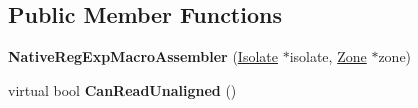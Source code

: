 \subsection*{Public Member Functions}
\begin{DoxyCompactItemize}
\item 
{\bfseries Native\+Reg\+Exp\+Macro\+Assembler} (\hyperlink{classv8_1_1internal_1_1_isolate}{Isolate} $\ast$isolate, \hyperlink{classv8_1_1internal_1_1_zone}{Zone} $\ast$zone)\hypertarget{classv8_1_1internal_1_1_native_reg_exp_macro_assembler_ad358daf117f249b9ae056f175def4b9d}{}\label{classv8_1_1internal_1_1_native_reg_exp_macro_assembler_ad358daf117f249b9ae056f175def4b9d}

\item 
virtual bool {\bfseries Can\+Read\+Unaligned} ()\hypertarget{classv8_1_1internal_1_1_native_reg_exp_macro_assembler_a1003ca71e0d3be0be6b29bcbd88c8d2f}{}\label{classv8_1_1internal_1_1_native_reg_exp_macro_assembler_a1003ca71e0d3be0be6b29bcbd88c8d2f}

\end{DoxyCompactItemize}
